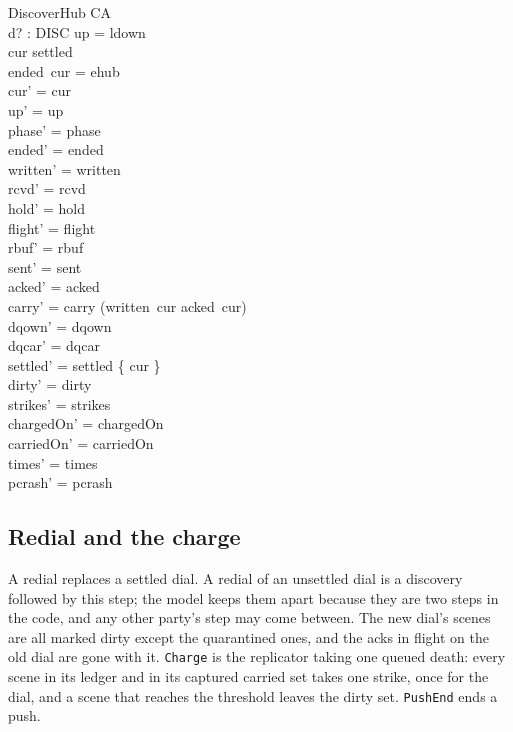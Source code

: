 \documentclass[a4paper,10pt,fleqn]{article}
\begin{document}
\begin{schema}{DiscoverHub}
  \Delta CA \\
  d? : DISC
\where
  up = ldown \\
  cur \notin settled \\
  ended~cur = ehub \\
  cur' = cur \\
  up' = up \\
  phase' = phase \\
  ended' = ended \\
  written' = written \\
  rcvd' = rcvd \\
  hold' = hold \\
  flight' = flight \\
  rbuf' = rbuf \\
  sent' = sent \\
  acked' = acked \\
  carry' = carry \cup (written~cur \setminus acked~cur) \\
  dqown' = dqown \\
  dqcar' = dqcar \\
  settled' = settled \cup \{ cur \} \\
  dirty' = dirty \\
  strikes' = strikes \\
  chargedOn' = chargedOn \\
  carriedOn' = carriedOn \\
  times' = times \\
  pcrash' = pcrash
\end{schema}

\subsection{Redial and the charge}

A redial replaces a settled dial.  A redial of an unsettled dial is a discovery
followed by this step; the model keeps them apart because they are two steps in
the code, and any other party's step may come between.  The new dial's scenes
are all marked dirty except the quarantined ones, and the acks in flight on the
old dial are gone with it.  \texttt{Charge} is the replicator taking one queued
death: every scene in its ledger and in its captured carried set takes one
strike, once for the dial, and a scene that reaches the threshold leaves the
dirty set.  \texttt{PushEnd} ends a push.
\end{document}
